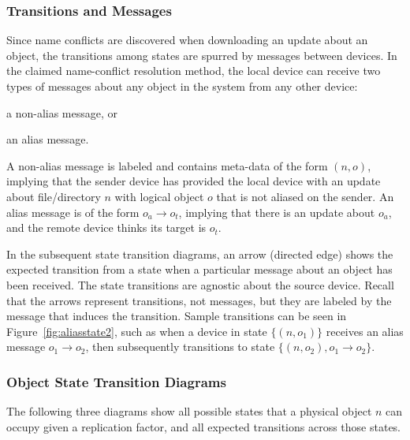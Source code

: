 \subsubsection*{Transitions and Messages}
Since name conflicts are discovered when downloading an update about an object,
the transitions among states are spurred by messages between devices. In the
claimed name-conflict resolution method, the local device can receive two types
of messages about any object in the system from any other device:
\begin{inparaenum}[(i)]
\item a non-alias message, or
\item an alias message.
\end{inparaenum}
A non-alias message is labeled and contains meta-data of the form $(n,o)$,
implying that the sender device has provided the local device with an update
about file/directory $n$ with logical object $o$ that is not aliased on the
sender. An alias message is of the form $o_a \rightarrow o_t$, implying
that there is an update about $o_a$, and the remote device thinks its target is
$o_t$.

In the subsequent state transition diagrams, an arrow (directed edge) shows the
expected transition from a state when a particular message about an object has
been received. The state transitions are agnostic about the source device.
Recall that the arrows represent transitions, not messages, but they are labeled
by the message that induces the transition. Sample transitions can be seen in
Figure~\ref{fig:aliasstate2}, such as when a device in state $\{(n,o_1)\}$
receives an alias message $o_1 \rightarrow o_2$, then subsequently transitions
to state $\{(n,o_2), o_1 \rightarrow o_2\}$.


\subsubsection*{Object State Transition Diagrams}

The following three diagrams show all possible states that a physical object
$n$ can occupy given a replication factor, and all expected transitions across
those states.

